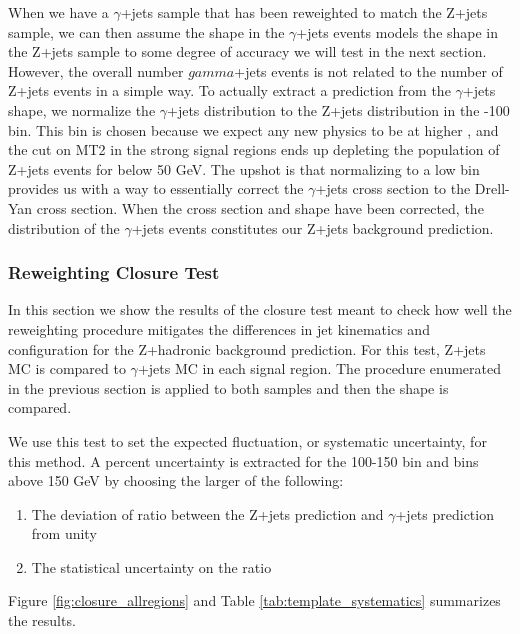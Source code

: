     When we have a $\gamma$+jets sample that has been \pt reweighted to match the Z+jets sample, we can then assume the \MET shape in the $\gamma$+jets events models the \MET shape in the Z+jets sample to some degree of accuracy we will test in the next section. However, the overall number $gamma$+jets events is not related to the number of Z+jets events in a simple way. To actually extract a prediction from the $\gamma$+jets \MET shape, we normalize the $\gamma$+jets \MET distribution to the Z+jets distribution in the -100 bin. This bin is chosen because we expect any new physics to be at higher \MET, and the cut on MT2 in the strong signal regions ends up depleting the population of Z+jets events for \MET below 50 GeV. The upshot is that normalizing to a low \MET bin provides us with a way to essentially correct the $\gamma$+jets cross section to the Drell-Yan cross section. When the cross section and \pt shape have been corrected, the \MET distribution of the $\gamma$+jets events constitutes our Z+jets background prediction.


    \subsubsection{\pt Reweighting Closure Test} \label{sec:pt_reweighting_closure_test}
      In this section we show the results of the closure test meant to check how well the \pt reweighting procedure mitigates the differences in jet kinematics and configuration for the Z+hadronic background prediction. For this test, Z+jets MC is compared to $\gamma$+jets MC in each signal region. The procedure enumerated in the previous section is applied to both samples and then the \MET shape is compared. 

      We use this test to set the expected fluctuation, or systematic uncertainty, for this method. A percent uncertainty is extracted for the 100-150 \MET bin and bins above 150 GeV by choosing the larger of the following:

      \begin{enumerate}
        \item The deviation of ratio between the Z+jets prediction and $\gamma$+jets prediction from unity

        \item The statistical uncertainty on the ratio
      \end{enumerate}     

      Figure \ref{fig:closure_allregions} and Table \ref{tab:template_systematics} summarizes the results.

